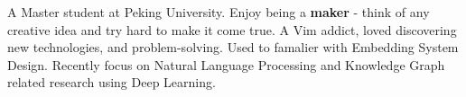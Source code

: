 

\begin{cvparagraph}

A Master student at Peking University. Enjoy being a \textbf{maker} - think of any creative idea and try hard to make it come true. A Vim addict, loved discovering new technologies, and problem-solving. Used to famalier with Embedding System Design. Recently focus on Natural Language Processing and Knowledge Graph related research using Deep Learning.
\end{cvparagraph}
